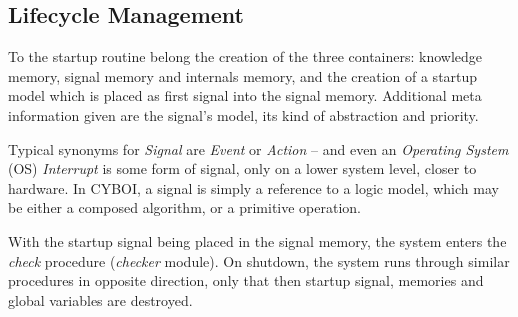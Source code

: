 %
%
%
%
%
%
%

\subsection{Lifecycle Management}
\label{lifecycle_management_heading}

To the startup routine belong the creation of the three containers: knowledge
memory, signal memory and internals memory, and the creation of a startup model
which is placed as first signal into the signal memory. Additional meta
information given are the signal's model, its kind of abstraction and priority.

Typical synonyms for \emph{Signal} are \emph{Event} or \emph{Action} -- and
even an \emph{Operating System} (OS) \emph{Interrupt} is some form of signal,
only on a lower system level, closer to hardware. In CYBOI, a signal is simply
a reference to a logic model, which may be either a composed algorithm, or a
primitive operation.

With the startup signal being placed in the signal memory, the system enters
the \emph{check} procedure (\emph{checker} module). On shutdown, the system
runs through similar procedures in opposite direction, only that then startup
signal, memories and global variables are destroyed.
